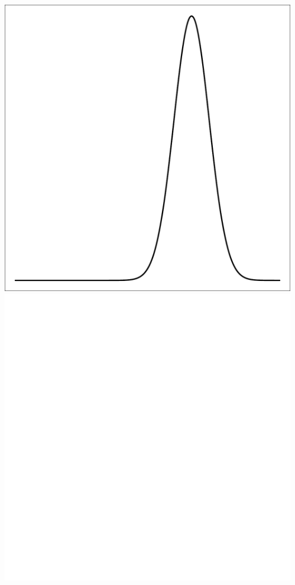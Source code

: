 \documentclass{beamer}
\begin{document}
\begin{frame}[t]
\begin{columns}[c]
\begin{flushright}
            \end{flushright}
            \begin{flushright}
                \includegraphics[width=1\textwidth]{bayesian_update_illustration_th3.pdf}\\
                \includegraphics[width=1\textwidth]{bayesian_update_illustration_blank.pdf}\\
            \end{flushright}
    \end{columns}
\end{frame}
\end{document}
